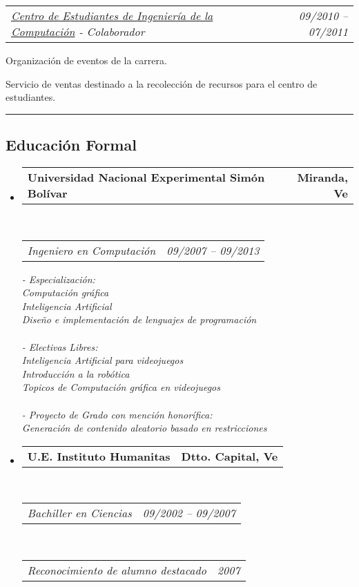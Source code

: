 \documentclass[10pt,letterpaper]{article}
\makeatletter
\newcommand{\headerrow}[2]
{\begin{tabular*}{\linewidth}{l@{\extracolsep{\fill}}r}
	#1 &
	#2 \\
\end{tabular*}}
\makeatother
\begin{document}
\begin{itemize}
  \headerrow
  {\emph{\href{http://usbceic.ldc.usb.ve}{Centro de Estudiantes de Ingeniería de la Computación} - Colaborador}}
  {\emph{09/2010 -- 07/2011}}
  \begin{itemize*}
  \item Organización de eventos de la carrera.
  \item Servicio de ventas destinado a la recolección
    de recursos para el centro de estudiantes.
  \end{itemize*}

\end{itemize}


\hrule

\vspace{-0.4em}
\subsection*{Educación Formal}

\begin{itemize}
	\parskip=0.1em

\item 
   \headerrow
   {\textbf{Universidad Nacional Experimental Simón Bolívar}}
   {\textbf{Miranda, Ve}}
	\\
	\headerrow
   {\emph{Ingeniero en Computación}}
   {\emph{09/2007 -- 09/2013}}
   
   
   {\emph{- Especialización:}}
   \\
   {\emph{     Computación gráfica}}
   \\
   {\emph{     Inteligencia Artificial}}
   \\
   {\emph{     Diseño e implementación de lenguajes de programación}}
   \\
   \\
   {\emph{- Electivas Libres:}}
   \\
   {\emph{     Inteligencia Artificial para videojuegos}}
   \\
   {\emph{     Introducción a la robótica}}
   \\
   {\emph{     Topicos de Computación gráfica en videojuegos}}
   \\
   \\
   {\emph{- Proyecto de Grado con mención honorífica:}}
   \\
   {\emph{     Generación de contenido aleatorio basado en restricciones}}

 \item 
   \headerrow
   {\textbf{U.E. Instituto Humanitas}}
   {\textbf{Dtto. Capital, Ve}}
	\\
	\headerrow
   {\emph{Bachiller en Ciencias}}
   {\emph{09/2002 -- 09/2007}}
	\\
	\headerrow
   {\emph{Reconocimiento de alumno destacado}}
   {\emph{2007}}
\end{itemize}
\end{document}
